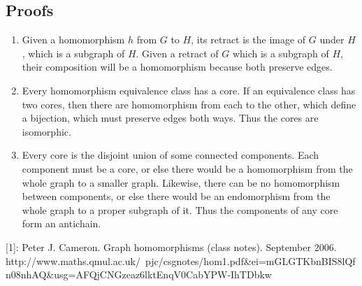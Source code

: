 \documentclass{article}
\begin{document}
\subsection{Proofs}
\begin{enumerate}
\item Given a homomorphism $h$ from $G$ to $H$, its retract is the
  image of $G$ under $H$, which is a subgraph of $H$. Given a retract
  of $G$ which is a subgraph of $H$, their composition will be a
  homomorphism because both preserve edges.
\item Every homomorphism equivalence class has a core. If an
  equivalence class has two cores, then there are homomorphism from
  each to the other, which define a bijection, which must preserve
  edges both ways. Thus the cores are isomorphic.
\item Every core is the disjoint union of some connected
  components. Each component must be a core, or else there would be a
  homomorphism from the whole graph to a smaller graph. Likewise,
  there can be no homomorphism between components, or else there would
  be an endomorphism from the whole graph to a proper subgraph of
  it. Thus the components of any core form an antichain.
\end{enumerate}

[1]: Peter J. Cameron. Graph homomorphisms (class notes). September 2006. http://www.maths.qmul.ac.uk/~pjc/csgnotes/hom1.pdf\&ei=mGLGTKbnBIS8lQfn08nhAQ\&usg=AFQjCNGzeaz6lktEnqV0CabYPW-IhTDbkw
\end{document}

